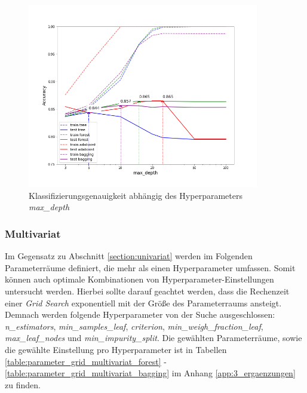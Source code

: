 \begin{figure}[ht]
	\centering
	\vspace*{-1.5 cm}
	\includegraphics[width = 0.9\textwidth]{Bilder/grid_search_max_depth.png}
	\caption{Klassifizierungsgenauigkeit abhängig des Hyperparameters \emph{max\_depth}}
	\label{fig:grid_search_max_depth_tree}
\end{figure}

 
\subsubsection{Multivariat}
Im Gegensatz zu Abschnitt \ref{section:univariat} werden im Folgenden Parameterräume definiert, die mehr als einen Hyperparameter umfassen. Somit können auch optimale Kombinationen von Hyperparameter-Einstellungen untersucht werden. Hierbei sollte darauf geachtet werden, dass die Rechenzeit einer \emph{Grid Search} exponentiell mit der Größe des Parameterraums ansteigt. Demnach werden folgende Hyperparameter von der Suche ausgeschlossen: \emph{n\_estimators}, \emph{min\_samples\_leaf}, \emph{criterion}, \emph{min\_weigh\_fraction\_leaf}, \emph{max\_leaf\_nodes} und \emph{min\_impurity\_split}. Die gewählten Parameterräume, sowie die gewählte Einstellung pro Hyperparameter ist in Tabellen \ref{table:parameter_grid_multivariat_forest} - \ref{table:parameter_grid_multivariat_bagging} im Anhang \ref{app:3_ergaenzungen} zu finden. %

